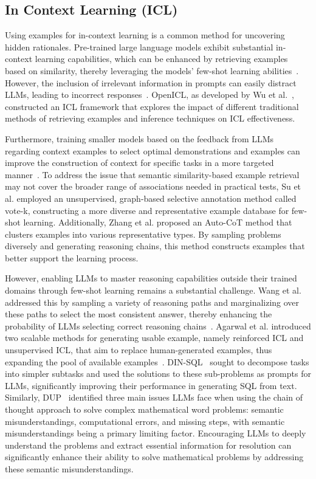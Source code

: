 \subsection{In Context Learning (ICL)}

Using examples for in-context learning is a common method for uncovering hidden rationales. Pre-trained large language models exhibit substantial in-context learning capabilities, which can be enhanced by retrieving examples based on similarity, thereby leveraging the models' few-shot learning abilities~\cite{liu2021makes, brown2020language}. However, the inclusion of irrelevant information in prompts can easily distract LLMs, leading to incorrect responses~\cite{shi2023large,chen2023many}. OpenICL, as developed by Wu et al.~\cite{wu2023openicl}, constructed an ICL framework that explores the impact of different traditional methods of retrieving examples and inference techniques on ICL effectiveness.

Furthermore, training smaller models based on the feedback from LLMs regarding context examples to select optimal demonstrations and examples can improve the construction of context for specific tasks in a more targeted manner~\cite{li2023unified, wang2024large, ye2023compositional}. To address the issue that semantic similarity-based example retrieval may not cover the broader range of associations needed in practical tests, Su et al.\cite{su2022selective} employed an unsupervised, graph-based selective annotation method called vote-k, constructing a more diverse and representative example database for few-shot learning. Additionally, Zhang et al.\cite{zhang2022automatic} proposed an Auto-CoT method that clusters examples into various representative types. By sampling problems diversely and generating reasoning chains, this method constructs examples that better support the learning process.

However, enabling LLMs to master reasoning capabilities outside their trained domains through few-shot learning remains a substantial challenge. Wang et al. addressed this by sampling a variety of reasoning paths and marginalizing over these paths to select the most consistent answer, thereby enhancing the probability of LLMs selecting correct reasoning chains~\cite{wang2022self}. Agarwal et al. introduced two scalable methods for generating usable example, namely reinforced ICL and unsupervised ICL, that aim to replace human-generated examples, thus expanding the pool of available examples~\cite{agarwal2024many}. DIN-SQL~\cite{pourreza2024din} sought to decompose tasks into simpler subtasks and used the solutions to these sub-problems as prompts for LLMs, significantly improving their performance in generating SQL from text. Similarly, DUP~\cite{zhong2024achieving} identified three main issues LLMs face when using the chain of thought approach to solve complex mathematical word problems: semantic misunderstandings, computational errors, and missing steps, with semantic misunderstandings being a primary limiting factor. Encouraging LLMs to deeply understand the problems and extract essential information for resolution can significantly enhance their ability to solve mathematical problems by addressing these semantic misunderstandings.

